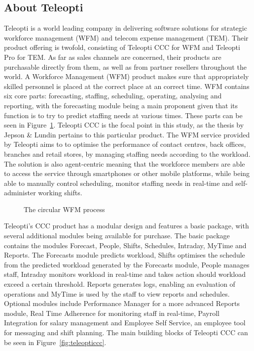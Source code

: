 \subsection{About Teleopti}
Teleopti is a world leading company in delivering software solutions for strategic workforce management (WFM) and telecom expense management (TEM). Their product offering is twofold, consisting of Teleopti CCC for WFM and Teleopti Pro for TEM. As far as sales channels are concerned, their products are purchasable directly from them, as well as from partner resellers throughout the world. A Workforce Management (WFM) product makes sure that appropriately skilled personnel is placed at the correct place at an correct time. WFM contains six core parts: forecasting, staffing, scheduling, operating, analysing and reporting, with the forecasting module being a main proponent given that its function is to try to predict staffing needs at various times. These parts can be seen in Figure~\ref{fig:wfm}. Teleopti CCC is the focal point in this study, as the thesis by Jepson \& Lundin pertains to this particular product. The WFM service provided by Teleopti aims to to optimise the performance of contact centres, back offices, branches and retail stores, by managing staffing needs according to the workload. The solution is also agent-centric meaning that the workforce members are able to access the service through smartphones or other mobile platforms, while being able to manually control scheduling, monitor staffing needs in real-time and self-administer working shifts.  
\begin{figure}[H]
    \centering
    \caption{The circular WFM process}
    \label{fig:wfm}
\end{figure}
Teleopti's CCC product has a modular design and features a basic package, with several additional modules being available for purchase. The basic package contains the modules Forecast, People, Shifts, Schedules, Intraday, MyTime and Reports. The Forecasts module predicts workload, Shifts optimises the schedule from the predicted workload generated by the Forecasts module, People manages staff, Intraday monitors workload in real-time and takes action should workload exceed a certain threshold. Reports generates logs, enabling an evaluation of operations and MyTime is used by the staff to view reports and schedules. Optional modules include Performance Manager for a more advanced Reports module, Real Time Adherence for monitoring staff in real-time, Payroll Integration for salary management and Employee Self Service, an employee tool for messaging and shift planning. The main building blocks of Teleopti CCC can be seen in Figure~\ref{fig:teleopticcc}.


